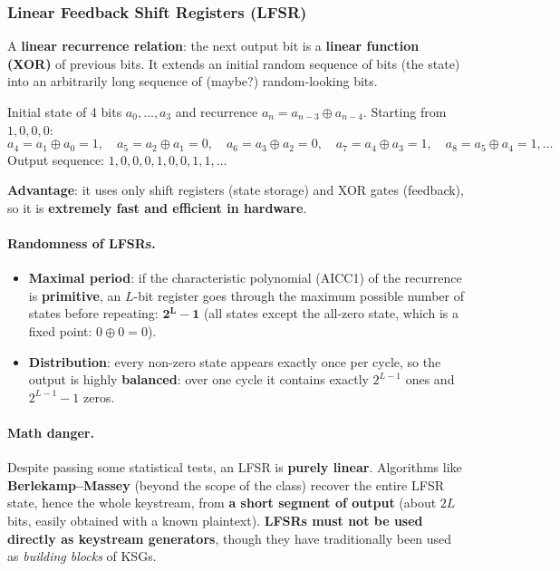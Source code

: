 \subsubsection{Linear Feedback Shift Registers (LFSR)}

\begin{definition}[LFSR]
A \textbf{linear recurrence relation}: the next output bit is a \textbf{linear function (XOR)} of previous bits. It extends an initial random sequence of bits (the state) into an arbitrarily long sequence of (maybe?) random-looking bits.
\end{definition}

\begin{example}
Initial state of 4 bits $a_0, \dots, a_3$ and recurrence $a_n = a_{n-3} \oplus a_{n-4}$. Starting from $1, 0, 0, 0$:
\[
a_4 = a_1 \oplus a_0 = 1,\quad a_5 = a_2 \oplus a_1 = 0,\quad a_6 = a_3 \oplus a_2 = 0,\quad a_7 = a_4 \oplus a_3 = 1,\quad a_8 = a_5 \oplus a_4 = 1, \dots
\]
Output sequence: $1, 0, 0, 0, 1, 0, 0, 1, 1, \dots$
\end{example}

\textbf{Advantage}: it uses only shift registers (state storage) and XOR gates (feedback), so it is \textbf{extremely fast and efficient in hardware}.

\paragraph{Randomness of LFSRs.}
\begin{itemize}
  \item \textbf{Maximal period}: if the characteristic polynomial (AICC1) of the recurrence is \textbf{primitive}, an $L$-bit register goes through the maximum possible number of states before repeating: $\mathbf{2^L - 1}$ (all states except the all-zero state, which is a fixed point: $0 \oplus 0 = 0$).
    \item \textbf{Distribution}: every non-zero state appears exactly once per cycle, so the output is highly \textbf{balanced}: over one cycle it contains exactly $2^{L-1}$ ones and $2^{L-1} - 1$ zeros.
\end{itemize}

\paragraph{Math danger.} Despite passing some statistical tests, an LFSR is \textbf{purely linear}. Algorithms like \textbf{Berlekamp--Massey} (beyond the scope of the class) recover the entire LFSR state, hence the whole keystream, from \textbf{a short segment of output} (about $2L$ bits, easily obtained with a known plaintext). \textbf{LFSRs must not be used directly as keystream generators}, though they have traditionally been used as \emph{building blocks} of KSGs.

